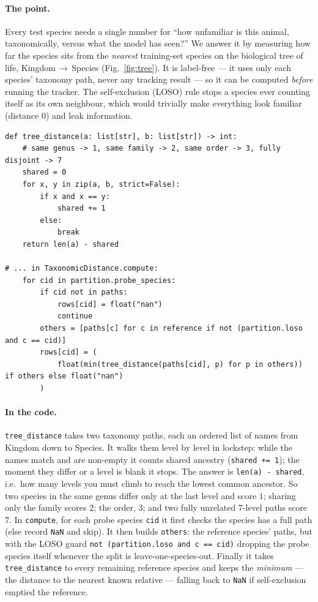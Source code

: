 \documentclass[11pt,a4paper]{article}
\newcommand{\code}[1]{\texttt{#1}}
\newcommand{\srcfile}[1]{\smallskip\noindent{\footnotesize\color{navy}\ttfamily\textbf{#1}}\par\nobreak\vspace{-0.15em}}
\begin{document}
\paragraph{The point.}
Every test species needs a single number for ``how unfamiliar is this animal, taxonomically, versus what the
model has seen?'' We answer it by measuring how far the species sits from the \emph{nearest} training-set
species on the biological tree of life, Kingdom\,$\to$\,Species (Fig.~\ref{fig:tree}). It is label-free ---
it uses only each species' taxonomy path, never any tracking result --- so it can be computed \emph{before}
running the tracker. The self-exclusion (LOSO) rule stops a species ever counting itself as its own
neighbour, which would trivially make everything look familiar (distance $0$) and leak information.

\srcfile{src/features/taxonomic.py}
\begin{lstlisting}[style=py]
def tree_distance(a: list[str], b: list[str]) -> int:
    # same genus -> 1, same family -> 2, same order -> 3, fully disjoint -> 7
    shared = 0
    for x, y in zip(a, b, strict=False):
        if x and x == y:
            shared += 1
        else:
            break
    return len(a) - shared

# ... in TaxonomicDistance.compute:
    for cid in partition.probe_species:
        if cid not in paths:
            rows[cid] = float("nan")
            continue
        others = [paths[c] for c in reference if not (partition.loso and c == cid)]
        rows[cid] = (
            float(min(tree_distance(paths[cid], p) for p in others)) if others else float("nan")
        )
\end{lstlisting}

\paragraph{In the code.}
\code{tree\_distance} takes two taxonomy paths, each an ordered list of names from Kingdom down to Species.
It walks them level by level in lockstep: while the names match and are non-empty it counts shared ancestry
(\code{shared += 1}); the moment they differ or a level is blank it stops. The answer is
\code{len(a) - shared}, i.e.\ how many levels you must climb to reach the lowest common ancestor. So two
species in the same genus differ only at the last level and score $1$; sharing only the family scores $2$;
the order, $3$; and two fully unrelated 7-level paths score $7$. In \code{compute}, for each probe species
\code{cid} it first checks the species has a full path (else record \code{NaN} and skip). It then builds
\code{others}: the reference species' paths, but with the LOSO guard
\code{not (partition.loso and c == cid)} dropping the probe species itself whenever the split is
leave-one-species-out. Finally it takes \code{tree\_distance} to every remaining reference species and keeps
the \emph{minimum} --- the distance to the nearest known relative --- falling back to \code{NaN} if
self-exclusion emptied the reference.
\end{document}
